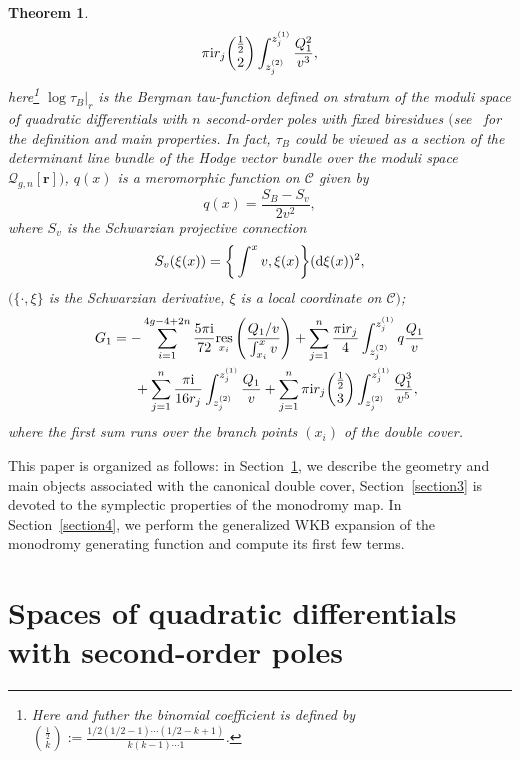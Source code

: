\documentclass[pdftex]{sigma}
\numberwithin{equation}{section}
\newtheorem{Theorem}{Theorem}[section]
\theoremstyle{definition}
\begin{document}
\begin{Theorem}
\begin{equation*}
\pi {\rm i} r_j \binom{\frac{1}{2}}{2}\int^{z^{(1)}_j}_{z^{(2)}_j}\frac{{Q^2_1}}{v^{3}},
\end{equation*}
here\footnote{Here and futher the binomial coefficient is defined by \textit{$\binom{\frac{1}{2}}{k}:=\frac{1/2(1/2-1)\cdots (1/2-k+1)}{k (k-1) \cdots 1}$}.}
$\log \tau_B|_{r}$ is the Bergman tau-function defined on stratum of the moduli space of quadratic differentials with $n$ second-order poles with fixed biresidues $($see~{\rm \cite{Bertola_2020}} for the definition and main properties. In fact, $\tau_B$ could be viewed as a section of the determinant line bundle of the Hodge vector
bundle over the moduli space $\mathcal{Q}_{g,n}[\mathbf{r}])$, $q(x)$ is a meromorphic function on $\mathcal{C}$ given by
\begin{equation}\label{47}q(x)=\frac{S_B-S_v}{2v^2}, \end{equation}
where $S_v$ is the Schwarzian projective connection
\begin{equation*}
S_v(\xi(x))=\bigg\{\int^x v, \xi(x) \bigg\}({\rm d} \xi(x))^2,
 \end{equation*}
$(\{\cdot, \xi\}$ is the Schwarzian derivative, $\xi$ is a local coordinate on $\mathcal{C})$;
\begin{gather*}%
G_1=-\sum^{4g-4+2n}_{i=1} \frac{5 \pi {\rm i}}{72}\underset{x_i}{\rm res}\left(\frac{Q_1/v}{\int^x_{x_i}v} \right)+\sum^{n}_{j=1}\frac{\pi {\rm i} r_j }{4}\int^{z^{(1)}_j}_{z^{(2)}_j} q\frac{Q_1}{v} \\
\hphantom{G_1=}{}
+\sum^{n}_{j=1}\frac{\pi {\rm i}}{16{r}_j}\int^{{z}^{(1)}_j}_{{z}^{(2)}_j}\frac{Q_1}{v}+\sum^n_{j=1}\pi {\rm i} r_j\binom{\frac{1}{2}}{3}
 \int^{z^{(1)}_j}_{z^{(2)}_j}\frac{Q^3_1}{v^{5}},
 \end{gather*}
where the first sum runs over the branch points $(x_i)$ of the double cover.
\end{Theorem}

This paper is organized as follows: in Section~\ref{section2}, we describe the geometry and main objects associated with the canonical double cover, Section~\ref{section3} is devoted to the symplectic properties of the monodromy map. In Section~\ref{section4}, we perform the generalized WKB expansion of the monodromy generating function and compute its first few terms.

\section{Spaces of quadratic differentials with second-order poles}\label{section2}
\end{document}
